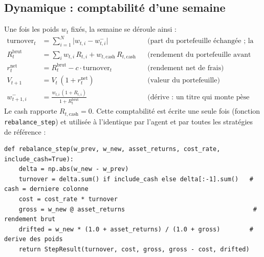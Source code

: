 \documentclass[11pt,a4paper]{article}
\begin{document}
\subsection{Dynamique : comptabilité d'une semaine}
Une fois les poids \(w_t\) fixés, la semaine se déroule ainsi :
\begin{align}
  \text{turnover}_t &= \sum_{i=1}^{N}\big|w_{t,i}-w^{-}_{t,i}\big|
  &&\text{(part du portefeuille échangée ; la jambe cash est gratuite)}\\
  R^{\text{brut}}_t &= \sum_{i} w_{t,i}\,R_{t,i} + w_{t,\text{cash}}\,R_{t,\text{cash}}
  &&\text{(rendement du portefeuille avant frais)}\\
  r^{\text{net}}_t &= R^{\text{brut}}_t - c\cdot\text{turnover}_t
  &&\text{(rendement net de frais)}\\
  V_{t+1} &= V_t\,(1+r^{\text{net}}_t)
  &&\text{(valeur du portefeuille)}\\
  w^{-}_{t+1,i} &= \frac{w_{t,i}\,(1+R_{t,i})}{1+R^{\text{brut}}_t}
  &&\text{(dérive : un titre qui monte pèse plus lourd)}
\end{align}
Le cash rapporte \(R_{t,\text{cash}}=0\). Cette comptabilité est écrite une seule fois (fonction
\texttt{rebalance\_step}) et utilisée à l'identique par l'agent et par toutes les stratégies de référence :

\begin{lstlisting}
def rebalance_step(w_prev, w_new, asset_returns, cost_rate, include_cash=True):
    delta = np.abs(w_new - w_prev)
    turnover = delta.sum() if include_cash else delta[:-1].sum()   # cash = derniere colonne
    cost = cost_rate * turnover
    gross = w_new @ asset_returns                                   # rendement brut
    drifted = w_new * (1.0 + asset_returns) / (1.0 + gross)        # derive des poids
    return StepResult(turnover, cost, gross, gross - cost, drifted)
\end{lstlisting}
\end{document}
